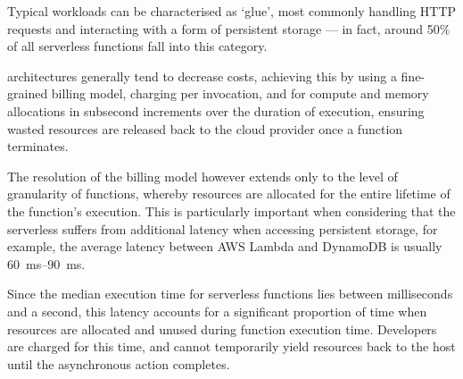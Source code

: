 Typical \faas{} workloads can be characterised as `glue', most commonly handling HTTP requests and interacting with a form of persistent storage --- in fact, around 50\% of all serverless functions fall into this category\cite{review-of-serverless-use-cases-and-characteristics}.

\faas{} architectures generally tend to decrease costs, achieving this by using a fine-grained billing model, charging per invocation, and for compute and memory allocations in subsecond increments over the duration of execution, ensuring wasted resources are released back to the cloud provider once a function terminates.

The resolution of the billing model however extends only to the level of granularity of functions, whereby resources are allocated for the entire lifetime of the function's execution. This is particularly important when considering that the serverless suffers from additional latency when accessing persistent storage, for example, the average latency between AWS Lambda and DynamoDB is usually \qtyrange{60}{90}{\ms}\cite{caching-techniques-improve-latency-serverless}.

Since the median execution time for serverless functions lies between milliseconds and a second\cite{review-of-serverless-use-cases-and-characteristics}, this latency accounts for a significant proportion of time when resources are allocated and unused during function execution time. Developers are charged for this time, and cannot temporarily yield resources back to the host until the asynchronous action completes.
